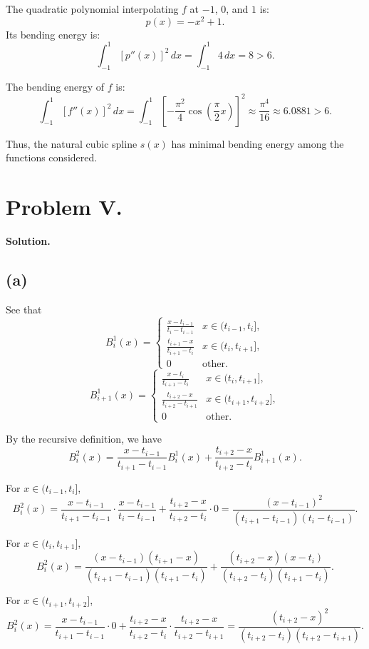 \documentclass[a4paper]{article}
\begin{document}
The quadratic polynomial interpolating \( f \) at \(-1\), \(0\), and \(1\) is:
\[
p(x) = -x^2 + 1.
\]
Its bending energy is:
\[
\int_{-1}^1 [p''(x)]^2 \, dx = \int_{-1}^1 4 \, dx = 8 > 6.
\]

The bending energy of \( f \) is:
\[
\int_{-1}^1 [f''(x)]^2 \, dx = \int_{-1}^1 \left[-\frac{\pi^2}{4} \cos\left(\frac{\pi}{2} x\right)\right]^2 \approx \frac{\pi^4}{16} \approx 6.0881 > 6.
\]

Thus, the natural cubic spline \( s(x) \) has minimal bending energy among the functions considered.

\section*{Problem V.}

\textbf{Solution.}

\subsection*{(a)}
See that 
\[
B_i^1(x) = 
\begin{cases} 
    \frac{x - t_{i-1}}{t_i - t_{i-1}} & x \in (t_{i-1}, t_i], \\
    \frac{t_{i+1} - x}{t_{i+1} - t_i} &  x \in (t_i, t_{i+1}], \\
    0 & \text{other}.
\end{cases}
\]
\[
B_{i+1}^1(x) = 
\begin{cases} 
    \frac{x - t_i}{t_{i+1} - t_i} &  x \in (t_i, t_{i+1}], \\ 
    \frac{t_{i+2} - x}{t_{i+2} - t_{i+1}} &  x \in (t_{i+1}, t_{i+2}], \\ 
    0 & \text{other}.
\end{cases}
\]

By the recursive definition, we have
\[
B_i^2(x) = \frac{x - t_{i-1}}{t_{i+1} - t_{i-1}} B_i^1(x) + \frac{t_{i+2} - x}{t_{i+2} - t_i} B_{i+1}^1(x).
\]

For \(x \in (t_{i-1}, t_i]\),
\[
B_i^2(x) = \frac{x - t_{i-1}}{t_{i+1} - t_{i-1}} \cdot \frac{x - t_{i-1}}{t_i - t_{i-1}} + \frac{t_{i+2} - x}{t_{i+2} - t_i} \cdot 0 = \frac{(x - t_{i-1})^2}{(t_{i+1} - t_{i-1})(t_i - t_{i-1})}.
\]

For \(x \in (t_i, t_{i+1}]\),
\[
B_i^2(x) = \frac{(x - t_{i-1})(t_{i+1} - x)}{(t_{i+1} - t_{i-1})(t_{i+1} - t_i)} + \frac{(t_{i+2} - x)(x - t_i)}{(t_{i+2} - t_i)(t_{i+1} - t_i)}.
\]

For \(x \in (t_{i+1}, t_{i+2}]\),
\[
B_i^2(x) = \frac{x - t_{i-1}}{t_{i+1} - t_{i-1}} \cdot 0 + \frac{t_{i+2} - x}{t_{i+2} - t_i} \cdot \frac{t_{i+2} - x}{t_{i+2} - t_{i+1}} = \frac{(t_{i+2} - x)^2}{(t_{i+2} - t_i)(t_{i+2} - t_{i+1})}.
\]
\end{document}
